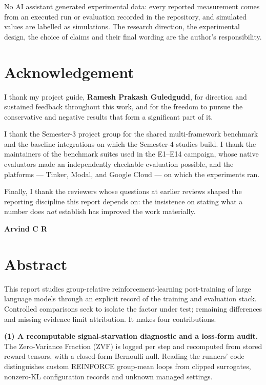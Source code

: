 No AI assistant generated experimental data: every reported measurement comes
from an executed run or evaluation recorded in the repository, and simulated
values are labelled as simulations. The research direction,
the experimental design, the choice of claims and their final wording are the
author's responsibility.

\chapter*{Acknowledgement}
\thispagestyle{plain}

I thank my project guide, \textbf{Ramesh Prakash Guledgudd}, for direction and
sustained feedback throughout this work, and for the freedom to pursue the
conservative and negative results that form a significant part of it.

I thank the Semester-3 project group for the shared multi-framework benchmark
and the baseline integrations on which the Semester-4 studies build. I thank
the maintainers of the benchmark suites used in the E1--E14 campaign, whose
native evaluators made an independently checkable evaluation possible, and the
platforms --- Tinker, Modal, and Google Cloud --- on which the experiments ran.

Finally, I thank the reviewers whose questions at earlier reviews shaped the
reporting discipline this report depends on: the insistence on stating what a
number does \emph{not} establish has improved the work materially.

\vspace{0.3in}
\noindent\textbf{Arvind C R}

\chapter*{Abstract}
\thispagestyle{plain}

This report studies group-relative reinforcement-learning post-training of
large language models through an explicit record of the training and
evaluation stack. Controlled comparisons seek to isolate the factor under
test; remaining differences and missing evidence limit attribution.
It makes four contributions.

\textbf{(1) A recomputable signal-starvation diagnostic and a loss-form
audit.} The Zero-Variance Fraction (ZVF) is logged per step and recomputed
from stored reward tensors, with a closed-form Bernoulli null. Reading the
runners' code distinguishes custom REINFORCE group-mean loops from clipped
surrogates, nonzero-KL configuration records and unknown managed settings.

